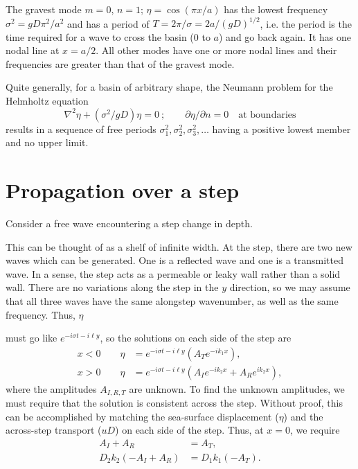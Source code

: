 \sourcepagebreak

The gravest mode $m=0$, $n=1$; $\eta=\cos(\pi x/a)$ has the lowest frequency
$\sigma^2=gD\pi^2/a^2$ and has a period of $T=2\pi/\sigma=2a/(gD)^{1/2}$, i.e. the
period is the time required for a wave to cross the basin (0 to $a$) and go back again.
It has one nodal line at $x=a/2$. All other modes have one or more nodal lines and
their frequencies are greater than that of the gravest mode.

Quite generally, for a basin of arbitrary shape, the Neumann problem for the Helmholtz
equation
\[
	\nabla^2\eta+(\sigma^2/gD)\eta=0
	\ ;\qquad
	\partial\eta/\partial n=0
	\quad\text{at boundaries}
\]
results in a sequence of free periods $\sigma_1^2,\sigma_2^2,\sigma_3^2,\ldots$
having a positive lowest member and no upper limit.

\section{Propagation over a step}

Consider a free wave encountering a step change in depth.


\wavefiguremark

This can be thought of as a shelf of infinite width. At the step, there are two new
waves which can be generated. One is a reflected wave and one is a transmitted wave.
In a sense, the step acts as a permeable or leaky wall rather than a solid wall. There
are no variations along the step in the $y$ direction, so we may assume that all three
waves have the same alongstep wavenumber, as well as the same frequency. Thus, $\eta$


must go like $e^{-i\sigma t-i\ell y}$, so the solutions on each side of the step are
\begin{align*}
	x<0\qquad
	\eta & =e^{-i\sigma t-i\ell y}\left(A_Te^{-ik_1x}\right), \\
	x>0\qquad
	\eta & =e^{-i\sigma t-i\ell y}
	\left(A_Ie^{-ik_2x}+A_Re^{ik_2x}\right),
\end{align*}
where the amplitudes $A_{I,R,T}$ are unknown. To find the unknown amplitudes, we must
require that the solution is consistent across the step. Without proof, this can be
accomplished by matching the sea-surface displacement ($\eta$) and the across-step
transport ($uD$) on each side of the step. Thus, at $x=0$, we require
\begin{align*}
	A_I+A_R          & =A_T,          \\
	D_2k_2(-A_I+A_R) & =D_1k_1(-A_T).
\end{align*}

